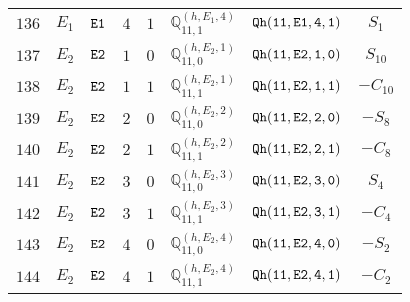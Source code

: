 \documentclass[fleqn,8pt]{jsarticle}
\begin{document}
\begin{table}[ht!]
\begin{center}
\begin{tabular}{cccccccc}
$ 136 $ & $ E_{1} $ & $ {\tt E1} $ & $ 4 $ & $ 1 $ & $ \mathbb{Q}_{11,1}^{(h,E_{1},4)} $ & $ {\tt Qh(11,E1,4,1)} $ & $ S_{1} $ \\
$ 137 $ & $ E_{2} $ & $ {\tt E2} $ & $ 1 $ & $ 0 $ & $ \mathbb{Q}_{11,0}^{(h,E_{2},1)} $ & $ {\tt Qh(11,E2,1,0)} $ & $ S_{10} $ \\
$ 138 $ & $ E_{2} $ & $ {\tt E2} $ & $ 1 $ & $ 1 $ & $ \mathbb{Q}_{11,1}^{(h,E_{2},1)} $ & $ {\tt Qh(11,E2,1,1)} $ & $ - C_{10} $ \\
$ 139 $ & $ E_{2} $ & $ {\tt E2} $ & $ 2 $ & $ 0 $ & $ \mathbb{Q}_{11,0}^{(h,E_{2},2)} $ & $ {\tt Qh(11,E2,2,0)} $ & $ - S_{8} $ \\
$ 140 $ & $ E_{2} $ & $ {\tt E2} $ & $ 2 $ & $ 1 $ & $ \mathbb{Q}_{11,1}^{(h,E_{2},2)} $ & $ {\tt Qh(11,E2,2,1)} $ & $ - C_{8} $ \\
$ 141 $ & $ E_{2} $ & $ {\tt E2} $ & $ 3 $ & $ 0 $ & $ \mathbb{Q}_{11,0}^{(h,E_{2},3)} $ & $ {\tt Qh(11,E2,3,0)} $ & $ S_{4} $ \\
$ 142 $ & $ E_{2} $ & $ {\tt E2} $ & $ 3 $ & $ 1 $ & $ \mathbb{Q}_{11,1}^{(h,E_{2},3)} $ & $ {\tt Qh(11,E2,3,1)} $ & $ - C_{4} $ \\
$ 143 $ & $ E_{2} $ & $ {\tt E2} $ & $ 4 $ & $ 0 $ & $ \mathbb{Q}_{11,0}^{(h,E_{2},4)} $ & $ {\tt Qh(11,E2,4,0)} $ & $ - S_{2} $ \\
$ 144 $ & $ E_{2} $ & $ {\tt E2} $ & $ 4 $ & $ 1 $ & $ \mathbb{Q}_{11,1}^{(h,E_{2},4)} $ & $ {\tt Qh(11,E2,4,1)} $ & $ - C_{2} $ \\
 \hline \hline
\end{tabular}
\end{center}
\end{table}
\end{document}
